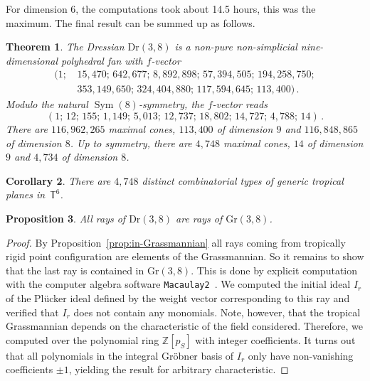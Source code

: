 \documentclass[11pt,a4paper]{amsart}
\newcommand{\ZZ}{{\mathbb{Z}}}
\DeclareMathOperator{\Sym}{Sym}
\newcommand{\TT}{{\mathbb{T}}}
\newcommand{\Gr}[2]{{\mathrm{Gr}(#1,#2)}}
\newcommand{\Dr}[2]{{\mathrm{Dr}(#1,#2)}}
\theoremstyle{plain}
\newtheorem{theorem}{Theorem}
\newtheorem{proposition}[theorem]{Proposition}
\newtheorem{corollary}[theorem]{Corollary}
\theoremstyle{definition}
\begin{document}
For dimension $6$, the computations took about 14.5 hours, this was the maximum.  The final result can
be summed up as follows.

\begin{theorem}\label{thm:polymake}
  The Dressian $\Dr38$ is a non-pure non-simplicial nine-dimensional polyhedral fan with $f$-vector
  \begin{equation*}
    \begin{aligned}
      (1;&\,15,\!470;\,642,\!677;\,8,\!892,\!898 ;\,57,\!394,\!505 ;\,194,\!258,\!750
      ; \\
      &\,353,\!149,\!650 ;\,324,\!404,\!880;\,117,\!594,\!645 ;\,113,\!400 )\,.
    \end{aligned}
  \end{equation*}
  Modulo the natural $\Sym(8)$-symmetry, the $f$-vector reads
  \[
  (1;\,12;\,155;\, 1,\!149;\, 5,\!013;\,12,\!737 ;\,18,\!802 ;\,14,\!727 ;\,4,\!788;\,14)\,.
  \]
  There are $116,\!962,\!265$ maximal cones, $113,\!400$ of dimension $9$ and
  $116,\!848,\!865$ of dimension $8$. Up to symmetry, there are $4,\!748$ maximal cones,
  $14$ of dimension $9$ and $4,\!734$ of dimension $8$.
\end{theorem}

\begin{corollary}
  There are $4,\!748$ distinct combinatorial types of generic tropical planes in~$\TT^6$.
\end{corollary}

\begin{proposition}
  All rays of $\Dr38$ are rays of $\Gr38$.
\end{proposition}

\begin{proof}
  By Proposition~\ref{prop:in-Grassmannian} all rays coming from tropically rigid point
  configuration are elements of the Grassmannian. So it remains to show that the last ray is
  contained in $\Gr 38$. This is done by explicit computation with the computer algebra
  software \texttt{Macaulay2}~\cite{M2}. We computed the initial ideal $I_r$ of the Pl\"ucker ideal
  defined by the weight vector corresponding to this ray and verified that $I_r$ does not
  contain any monomials. Note, however, that the tropical Grassmannian depends on the characteristic
  of the field considered.  Therefore, we computed over the polynomial ring $\ZZ[p_S]$ with integer
  coefficients.  It turns out that all polynomials in the integral Gr\"obner basis of $I_r$ only
  have non-vanishing coefficients $\pm1$, yielding the result for arbitrary characteristic.
\end{proof}
\end{document}
